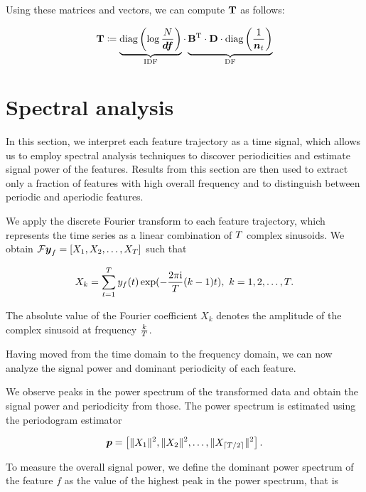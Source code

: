 Using these matrices and vectors, we can compute $\mathbf{T}$ as follows:

\begin{equation}
	\trajmat \coloneqq
		\underbrace{\text{diag} \left( \log{\frac{\doccount}{\vect{\df}}} \right)}_{\text{IDF}}
		\cdot
		\underbrace{\bowmat^{\T}
		\cdot \dtdmat
		\cdot \text{diag} \left( \frac{1}{\vect{\doccount}_{t}} \right)}_{\text{DF}}
\end{equation}


\section{Spectral analysis}
In this section, we interpret each feature trajectory as a time signal, which allows us to employ spectral analysis techniques to discover periodicities and estimate signal power of the features. Results from this section are then used to extract only a fraction of features with high overall frequency and to distinguish between periodic and aperiodic features.

We apply the discrete Fourier transform to each feature trajectory, which represents the time series as a linear combination of $T$ complex sinusoids. We obtain $\mathcal{F} \vect{\traj}_{f} = \left[ X_{1}, X_{2}, \dots, X_{\streamlen}\right ]$ such that

\begin{equation*}
	X_{k} = \sum_{t = 1}^{T}{y_{f}(t) \exp(- \frac{2 \pi \mathrm{i}}{T} (k - 1) t}), ~ k = 1, 2, \dots, T.
\end{equation*}

The absolute value of the Fourier coefficient $X_{k}$ denotes the amplitude of the complex sinusoid at frequency $\frac{k}{T}$.

Having moved from the time domain to the frequency domain, we can now analyze the signal power and dominant periodicity of each feature.

We observe peaks in the power spectrum of the transformed data and obtain the signal power and periodicity from those. The power spectrum is estimated using the periodogram estimator

\begin{equation*}
	\vect{P} = \left[ \|X_{1}\|^{2}, \|X_{2}\|^{2}, \dots, \|X_{\ceil{\streamlen / 2}}\|^{2} \right].
\end{equation*}

To measure the overall signal power, we define the dominant power spectrum of the feature $f$ as the value of the highest peak in the power spectrum, that is

